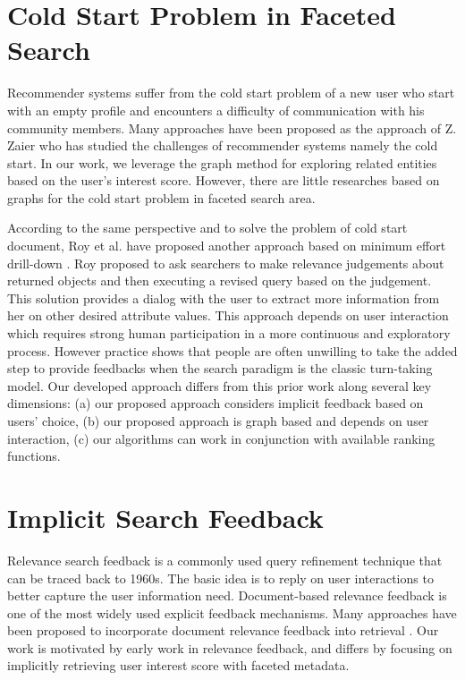 \section{Cold Start Problem in Faceted Search}

Recommender systems suffer from the cold start problem of a new user who start with an empty profile and encounters a difficulty of communication with his community members. Many approaches have been proposed \cite{Gao2002} as the approach of Z. Zaier\cite{Zaier2010} who has studied the challenges of recommender systems namely the cold start. In our work, we leverage the graph method for exploring related entities based on the user's interest score. However, there are little researches based on graphs for the cold start problem in faceted search area. 

According to the same perspective and to solve the problem of cold start document, Roy et al. have proposed another approach based on minimum effort drill-down \cite{Roy2008}. Roy proposed to ask searchers to make relevance judgements about returned objects and then executing a revised query based on the judgement. This solution provides a dialog with the user to extract more information from her on other desired attribute values. This approach depends on user interaction which requires strong human participation in a more continuous and exploratory process. However practice shows that people are often unwilling to take the added step to provide feedbacks when the search paradigm is the classic turn-taking model. Our developed approach differs from this prior work along several key dimensions: (a) our proposed approach considers implicit feedback based on users' choice, (b) our proposed approach is graph based and depends on user interaction, (c) our algorithms can work in conjunction with available ranking functions.

\section{Implicit Search Feedback}

Relevance search feedback is a commonly used query refinement technique that can be traced back to 1960s. The basic idea is to reply on user interactions to better capture the user information need. Document-based relevance feedback is one of the most widely used explicit feedback mechanisms. Many approaches have been proposed to incorporate document relevance feedback into retrieval \cite{Zhai2001, Zhang2004}. Our work is motivated by early work in relevance feedback, and differs by focusing on implicitly retrieving user interest score with faceted metadata.


